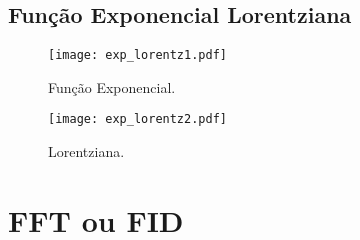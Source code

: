 \newpage

\subsection{Função Exponencial \boldmath{$\rightarrow$} Lorentziana}



\begin{figure}[!ht]
    \centering
    \begin{minipage}[b]{0.49\textwidth}
        \centering
        \texttt{[image: exp\_lorentz1.pdf]}
        \caption{Função Exponencial.}
    \end{minipage}
    \hfill
    \begin{minipage}[b]{0.49\textwidth}
        \centering
        \texttt{[image: exp\_lorentz2.pdf]}
        \caption{Lorentziana.}
    \end{minipage}
\end{figure}

\section{FFT ou FID}